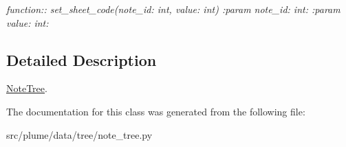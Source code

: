 \begin{DoxyCompactItemize}
\begin{DoxyCompactList}\small\item\em function\+:\+: set\+\_\+sheet\+\_\+code(note\+\_\+id\+: int, value\+: int) \+:param note\+\_\+id\+: int\+: \+:param value\+: int\+: \end{DoxyCompactList}\end{DoxyCompactItemize}


\subsection{Detailed Description}
\hyperlink{classplume-creator_1_1src_1_1plume_1_1data_1_1tree_1_1note__tree_1_1_note_tree}{Note\+Tree}. 

The documentation for this class was generated from the following file\+:\begin{DoxyCompactItemize}
\item 
src/plume/data/tree/note\+\_\+tree.\+py\end{DoxyCompactItemize}

